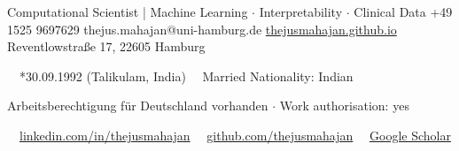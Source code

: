 \documentclass{thejus_cv}
\begin{document}
         {Computational Scientist | Machine Learning $\cdot$ Interpretability $\cdot$ Clinical Data}
         {+49 1525 9697629}
         {thejus.mahajan@uni-hamburg.de}
         {\href{https://thejusmahajan.github.io}{thejusmahajan.github.io}}
         {Reventlowstra{\ss}e 17, 22605 Hamburg}

\vspace{-1.45cm}
{\small\color{white}
\faCalendar\ \ *30.09.1992 (Talikulam, India) \hspace{0.5cm} \faUser\ \ Married \hspace{0.5cm} Nationality: Indian
}\par
\vspace{0.1cm}
{\small\color{white}
Arbeitsberechtigung f\"ur Deutschland vorhanden $\cdot$ Work authorisation: yes
}\par
\vspace{0.1cm}
{\small\color{white}
\faLinkedin\ \ \href{https://www.linkedin.com/in/thejusmahajan/}{linkedin.com/in/thejusmahajan}
\hspace{0.5cm}
\faGithub\ \ \href{https://github.com/thejusmahajan}{github.com/thejusmahajan}
\hspace{0.5cm}
\faGraduationCap\ \ \href{https://scholar.google.com/citations?user=PJkZwAwAAAAJ}{Google Scholar}
}\par
\vspace{0.1cm}
\end{document}
